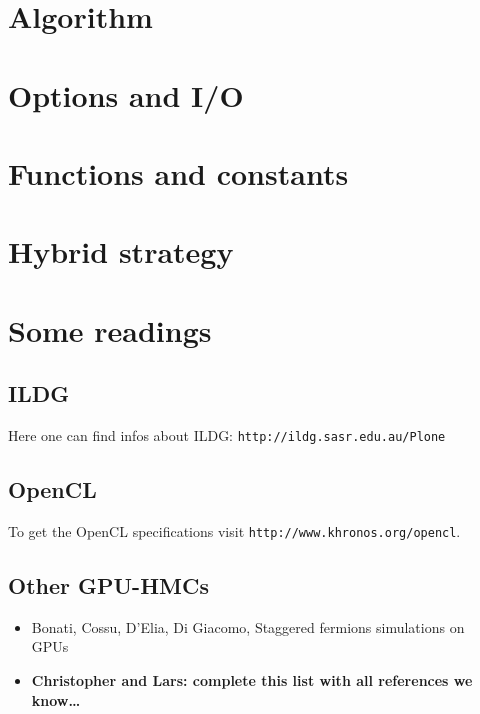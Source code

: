 \documentclass[a4paper,11pt]{article}
\newcommand{\url}[1]{\texttt{#1}}
\begin{document}
\section{Algorithm}


\section{Options and I/O}


\section{Functions and constants}


\section{Hybrid strategy}


\section{Some readings}
\subsection{ILDG}
Here one can find infos about ILDG: \url{http://ildg.sasr.edu.au/Plone}
\subsection{OpenCL}
To get the OpenCL specifications visit \url{http://www.khronos.org/opencl}.
\subsection{Other GPU-HMCs}
\begin{itemize}
\item Bonati, Cossu, D'Elia, Di Giacomo, Staggered fermions simulations on GPUs~\cite{Bonati:2010qu}
\item {\bf Christopher and Lars: complete this list with all references we know\ldots}
\end{itemize}



\end{document}
